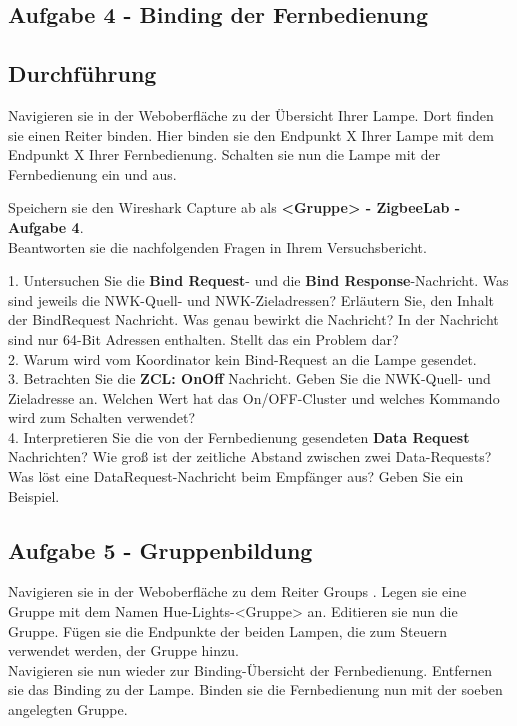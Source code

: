 \subsection{Aufgabe 4 - Binding der Fernbedienung}

\subsection{Durchführung}

Navigieren sie in der Weboberfläche zu der Übersicht Ihrer Lampe. Dort finden sie einen Reiter \grqq binden\grqq{}. Hier binden sie den Endpunkt X Ihrer Lampe mit dem Endpunkt X Ihrer Fernbedienung. 
Schalten sie nun die Lampe mit der Fernbedienung ein und aus. 

\begin{Hinweis}
    Speichern sie den Wireshark Capture ab als \textbf{\grqq <Gruppe> - ZigbeeLab - Aufgabe 4\grqq{}}. \\
    Beantworten sie die nachfolgenden Fragen in Ihrem Versuchsbericht.
\end{Hinweis}

\begin{Fragen}
1. Untersuchen Sie die \textbf{Bind Request}- und die \textbf{Bind Response}-Nachricht. 
Was sind jeweils die NWK-Quell- und NWK-Zieladressen? Erläutern Sie, den Inhalt der BindRequest Nachricht. 
Was genau bewirkt die Nachricht? In der Nachricht sind nur 64-Bit Adressen enthalten. Stellt das ein Problem dar? \\

2. Warum wird vom Koordinator kein Bind-Request an die Lampe gesendet. \\

3. Betrachten Sie die \textbf{ZCL: OnOff} Nachricht. Geben Sie die NWK-Quell- und Zieladresse an. 
Welchen Wert hat das On/OFF-Cluster und welches Kommando wird zum Schalten verwendet?\\

4. Interpretieren Sie die von der Fernbedienung gesendeten \textbf{Data Request} Nachrichten?
Wie groß ist der zeitliche Abstand zwischen zwei Data-Requests? Was löst eine DataRequest-Nachricht beim Empfänger aus? Geben Sie ein Beispiel. 
\end{Fragen}

\subsection{Aufgabe 5 - Gruppenbildung}

Navigieren sie in der Weboberfläche zu dem Reiter \grqq Groups \grqq{}. Legen sie eine Gruppe mit dem Namen \grqq Hue-Lights-<Gruppe> \grqq{} an.
Editieren sie nun die Gruppe. Fügen sie die Endpunkte der beiden Lampen, die zum Steuern verwendet werden, der Gruppe hinzu. \\
Navigieren sie nun wieder zur Binding-Übersicht der Fernbedienung. Entfernen sie das Binding zu der Lampe. Binden sie die Fernbedienung nun mit der soeben
angelegten Gruppe.

